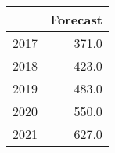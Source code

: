 \begin{tabular}{lr}
\toprule
{} &  Forecast \\
\midrule
2017 &     371.0 \\
2018 &     423.0 \\
2019 &     483.0 \\
2020 &     550.0 \\
2021 &     627.0 \\
\bottomrule
\end{tabular}
